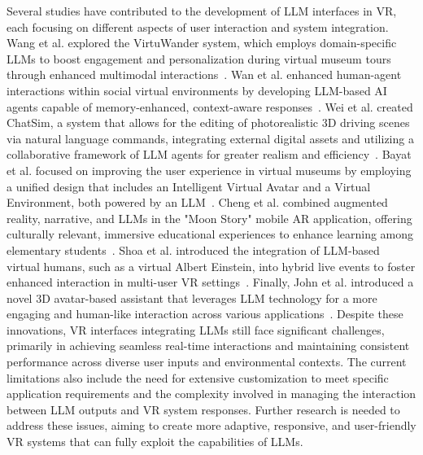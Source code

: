 Several studies have contributed to the development of LLM interfaces in VR, each focusing on different aspects of user interaction and system integration. Wang et al. explored the VirtuWander system, which employs domain-specific LLMs to boost engagement and personalization during virtual museum tours through enhanced multimodal interactions~\cite{wang2024virtuwander}. Wan et al. enhanced human-agent interactions within social virtual environments by developing LLM-based AI agents capable of memory-enhanced, context-aware responses~\cite{wan2024building}. Wei et al. created ChatSim, a system that allows for the editing of photorealistic 3D driving scenes via natural language commands, integrating external digital assets and utilizing a collaborative framework of LLM agents for greater realism and efficiency~\cite{wei2024editable}. Bayat et al. focused on improving the user experience in virtual museums by employing a unified design that includes an Intelligent Virtual Avatar and a Virtual Environment, both powered by an LLM~\cite{bayat2024exploring}. Cheng et al. combined augmented reality, narrative, and LLMs in the "Moon Story" mobile AR application, offering culturally relevant, immersive educational experiences to enhance learning among elementary students~\cite{cheng2024scientific}. Shoa et al. introduced the integration of LLM-based virtual humans, such as a virtual Albert Einstein, into hybrid live events to foster enhanced interaction in multi-user VR settings~\cite{shoa2023sushi}. Finally, John et al. introduced a novel 3D avatar-based assistant that leverages LLM technology for a more engaging and human-like interaction across various applications~\cite{john2024llm}. Despite these innovations, VR interfaces integrating LLMs still face significant challenges, primarily in achieving seamless real-time interactions and maintaining consistent performance across diverse user inputs and environmental contexts. The current limitations also include the need for extensive customization to meet specific application requirements and the complexity involved in managing the interaction between LLM outputs and VR system responses. Further research is needed to address these issues, aiming to create more adaptive, responsive, and user-friendly VR systems that can fully exploit the capabilities of LLMs. 


